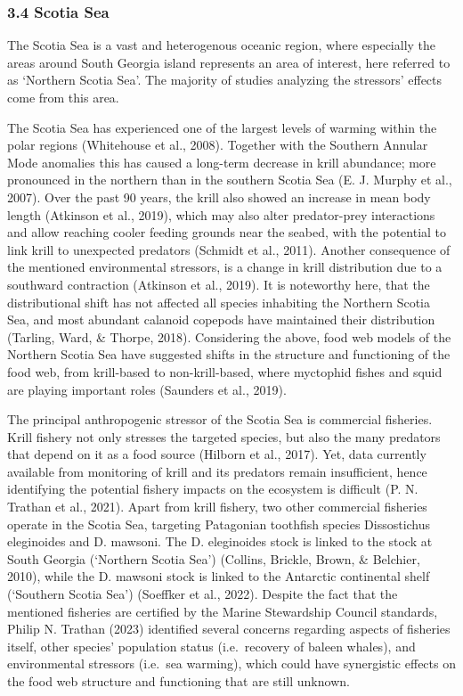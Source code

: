 \documentclass[
]{article}
\begin{document}
\hypertarget{scotia-sea}{%
\subsubsection{3.4 Scotia Sea}\label{scotia-sea}}

The Scotia Sea is a vast and heterogenous oceanic region, where
especially the areas around South Georgia island represents an area of
interest, here referred to as `Northern Scotia Sea'. The majority of
studies analyzing the stressors' effects come from this area.

The Scotia Sea has experienced one of the largest levels of warming
within the polar regions (Whitehouse et al., 2008). Together with the
Southern Annular Mode anomalies this has caused a long-term decrease in
krill abundance; more pronounced in the northern than in the southern
Scotia Sea (E. J. Murphy et al., 2007). Over the past 90 years, the
krill also showed an increase in mean body length (Atkinson et al.,
2019), which may also alter predator-prey interactions and allow
reaching cooler feeding grounds near the seabed, with the potential to
link krill to unexpected predators (Schmidt et al., 2011). Another
consequence of the mentioned environmental stressors, is a change in
krill distribution due to a southward contraction (Atkinson et al.,
2019). It is noteworthy here, that the distributional shift has not
affected all species inhabiting the Northern Scotia Sea, and most
abundant calanoid copepods have maintained their distribution (Tarling,
Ward, \& Thorpe, 2018). Considering the above, food web models of the
Northern Scotia Sea have suggested shifts in the structure and
functioning of the food web, from krill-based to non-krill-based, where
myctophid fishes and squid are playing important roles (Saunders et al.,
2019).

The principal anthropogenic stressor of the Scotia Sea is commercial
fisheries. Krill fishery not only stresses the targeted species, but
also the many predators that depend on it as a food source (Hilborn et
al., 2017). Yet, data currently available from monitoring of krill and
its predators remain insufficient, hence identifying the potential
fishery impacts on the ecosystem is difficult (P. N. Trathan et al.,
2021). Apart from krill fishery, two other commercial fisheries operate
in the Scotia Sea, targeting Patagonian toothfish species Dissostichus
eleginoides and D. mawsoni. The D. eleginoides stock is linked to the
stock at South Georgia (`Northern Scotia Sea') (Collins, Brickle, Brown,
\& Belchier, 2010), while the D. mawsoni stock is linked to the
Antarctic continental shelf (`Southern Scotia Sea') (Soeffker et al.,
2022). Despite the fact that the mentioned fisheries are certified by
the Marine Stewardship Council standards, Philip N. Trathan (2023)
identified several concerns regarding aspects of fisheries itself, other
species' population status (i.e.~recovery of baleen whales), and
environmental stressors (i.e.~sea warming), which could have synergistic
effects on the food web structure and functioning that are still
unknown.
\end{document}
